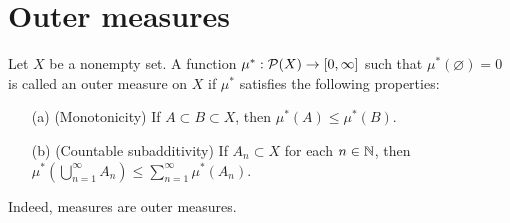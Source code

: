 \section{Outer measures}

\begin{defi}
    Let $X$ be a nonempty set.
    A function $\mu^*: {\mathcal{P}}(X)\rightarrow[0, \infty]$ such that $\mu^*(\varnothing)=0$ is called an outer measure on $X$ if $\mu^*$ satisfies the following properties:
    \begin{enumerate}
        \item[(a)]
        {
            (Monotonicity) If $A\subset B\subset X$, then $\mu^*(A)\leq\mu^*(B)$.
        }
        \item[(b)]
        {
            (Countable subadditivity) If $A_n\subset X$ for each $n\in{\mathbb{N}}$, then $\mu^*\left(\bigcup_{n=1}^\infty A_n\right)\leq\sum_{n=1}^\infty\mu^*(A_n)$.
        }
    \end{enumerate}
    Indeed, measures are outer measures.
\end{defi}

